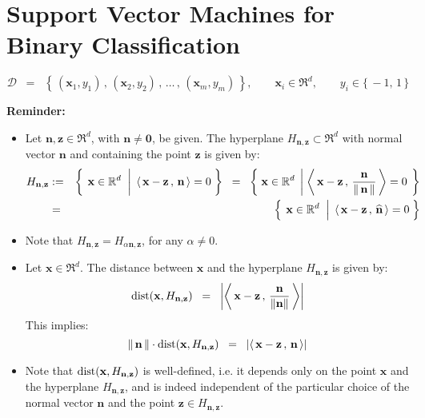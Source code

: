 
\section{Support Vector Machines for Binary Classification}
\setcounter{theorem}{0}

\begin{equation*}
\mathcal{D} \;\; = \;\; \left\{\,(\mathbf{x}_{1},y_{1})\,,\,(\mathbf{x}_{2},y_{2})\,,\,\ldots\,,\,(\mathbf{x}_{m},y_{m})\,\right\},
\quad\quad
\mathbf{x}_{i} \in \Re^{d},
\quad\quad
y_{i} \in \{\,-1,\,1\,\}
\end{equation*}

\vskip 0.5cm
\noindent
\textbf{Reminder:}
\begin{itemize}
\item  Let $\mathbf{n}, \mathbf{z} \in \Re^{d}$, with $\mathbf{n} \neq \mathbf{0}$, be given.
          The hyperplane $H_{\mathbf{n},\mathbf{z}} \subset \Re^{d}$ with normal vector $\mathbf{n}$ and
          containing the point $\mathbf{z}$ is given by: 
          \begin{eqnarray*}
          H_{\mathbf{n},\mathbf{z}}
          & := &
          \left\{\;
          	\left.
          	\mathbf{x}\overset{{\color{white}1}}{\in}\Re^{d}
		\;\;\right\vert\;
			\left\langle\,\mathbf{x}-\mathbf{z}\,,\,\mathbf{n}\,\right\rangle = 0
			\;\right\}
	\;\; = \;\;
	\left\{\;
		\mathbf{x}\in\Re^{d}
		\;\left\vert\;
			\left\langle\,\mathbf{x}-\mathbf{z}\,,\,\frac{\mathbf{n}}{\Vert\,\mathbf{n}\,\Vert}\,\right\rangle = 0
			\right.\;\right\}
	\\
	& = &
	\left\{\;
		\left.
		\mathbf{x}\overset{{\color{white}.}}{\in}\Re^{d}
		\;\;\right\vert\;
			\left\langle\,\mathbf{x}-\mathbf{z}\,,\,\widehat{\mathbf{n}}\,\right\rangle = 0
		\;\right\}
	\end{eqnarray*}
	
\item
	Note that $H_{\mathbf{n},\mathbf{z}} = H_{\alpha\mathbf{n},\mathbf{z}}$, for any $\alpha \neq 0$.
\item
	Let $\mathbf{x} \in \Re^{d}$.  The distance between $\mathbf{x}$ and the hyperplane $H_{\mathbf{n},\mathbf{z}}$
	is given by:
	\begin{equation*}
	\textnormal{dist}\!\left(\mathbf{x},H_{\mathbf{n},\mathbf{z}}\right) \;\; = \;\;
	\left\vert
	\left\langle\,\mathbf{x}-\mathbf{z}\,,\,\dfrac{\mathbf{n}}{\Vert\mathbf{n}\Vert}\,\right\rangle
	\right\vert
	\end{equation*}
	This implies:
	\begin{equation*}
	\Vert\,\mathbf{n}\,\Vert
	\cdot\textnormal{dist}\!\left(\mathbf{x},H_{\mathbf{n},\mathbf{z}}\right) \;\; = \;\;
	\left\vert\left\langle\,\mathbf{x}-\mathbf{z}\,,\,\mathbf{n}\,\right\rangle\right\vert
	\end{equation*}
\item
	Note that
	$\textnormal{dist}\!\left(\mathbf{x},H_{\mathbf{n},\mathbf{z}}\right)$ is well-defined,
	i.e. it depends only on the point $\mathbf{x}$ and the hyperplane
	$H_{\mathbf{n},\mathbf{z}}$, and is indeed independent of the particular choice
	of the normal vector $\mathbf{n}$ and the point
	$\mathbf{z} \in H_{\mathbf{n},\mathbf{z}}$. 
\end{itemize}

